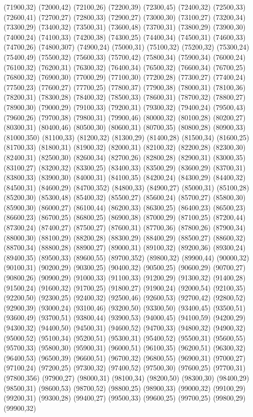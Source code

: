 (71900,32)
(72000,42)
(72100,26)
(72200,39)
(72300,45)
(72400,32)
(72500,33)
(72600,41)
(72700,27)
(72800,33)
(72900,27)
(73000,30)
(73100,27)
(73200,34)
(73300,29)
(73400,32)
(73500,31)
(73600,48)
(73700,31)
(73800,29)
(73900,30)
(74000,24)
(74100,33)
(74200,38)
(74300,25)
(74400,34)
(74500,31)
(74600,33)
(74700,26)
(74800,307)
(74900,24)
(75000,31)
(75100,32)
(75200,32)
(75300,24)
(75400,49)
(75500,32)
(75600,33)
(75700,42)
(75800,34)
(75900,34)
(76000,24)
(76100,32)
(76200,31)
(76300,32)
(76400,34)
(76500,32)
(76600,34)
(76700,25)
(76800,32)
(76900,30)
(77000,29)
(77100,30)
(77200,28)
(77300,27)
(77400,24)
(77500,23)
(77600,27)
(77700,25)
(77800,37)
(77900,38)
(78000,31)
(78100,36)
(78200,31)
(78300,28)
(78400,32)
(78500,33)
(78600,31)
(78700,32)
(78800,27)
(78900,30)
(79000,29)
(79100,33)
(79200,31)
(79300,32)
(79400,24)
(79500,43)
(79600,26)
(79700,38)
(79800,31)
(79900,46)
(80000,32)
(80100,28)
(80200,27)
(80300,31)
(80400,46)
(80500,30)
(80600,31)
(80700,35)
(80800,28)
(80900,33)
(81000,350)
(81100,33)
(81200,32)
(81300,29)
(81400,28)
(81500,34)
(81600,25)
(81700,33)
(81800,31)
(81900,32)
(82000,31)
(82100,32)
(82200,28)
(82300,30)
(82400,31)
(82500,30)
(82600,34)
(82700,26)
(82800,28)
(82900,31)
(83000,35)
(83100,27)
(83200,32)
(83300,25)
(83400,33)
(83500,29)
(83600,29)
(83700,31)
(83800,33)
(83900,30)
(84000,31)
(84100,35)
(84200,24)
(84300,29)
(84400,32)
(84500,31)
(84600,29)
(84700,352)
(84800,33)
(84900,27)
(85000,31)
(85100,28)
(85200,30)
(85300,48)
(85400,32)
(85500,27)
(85600,24)
(85700,27)
(85800,30)
(85900,30)
(86000,27)
(86100,44)
(86200,33)
(86300,25)
(86400,23)
(86500,23)
(86600,23)
(86700,25)
(86800,25)
(86900,38)
(87000,29)
(87100,25)
(87200,44)
(87300,24)
(87400,27)
(87500,27)
(87600,31)
(87700,36)
(87800,26)
(87900,34)
(88000,30)
(88100,29)
(88200,28)
(88300,29)
(88400,29)
(88500,27)
(88600,32)
(88700,34)
(88800,28)
(88900,27)
(89000,31)
(89100,32)
(89200,36)
(89300,24)
(89400,35)
(89500,33)
(89600,55)
(89700,352)
(89800,32)
(89900,44)
(90000,32)
(90100,31)
(90200,29)
(90300,25)
(90400,32)
(90500,25)
(90600,29)
(90700,27)
(90800,26)
(90900,29)
(91000,33)
(91100,33)
(91200,29)
(91300,32)
(91400,28)
(91500,24)
(91600,32)
(91700,25)
(91800,27)
(91900,24)
(92000,54)
(92100,35)
(92200,50)
(92300,25)
(92400,32)
(92500,46)
(92600,53)
(92700,42)
(92800,52)
(92900,39)
(93000,24)
(93100,46)
(93200,50)
(93300,50)
(93400,45)
(93500,51)
(93600,49)
(93700,51)
(93800,44)
(93900,53)
(94000,45)
(94100,59)
(94200,29)
(94300,32)
(94400,50)
(94500,31)
(94600,52)
(94700,33)
(94800,32)
(94900,32)
(95000,52)
(95100,34)
(95200,51)
(95300,31)
(95400,52)
(95500,31)
(95600,55)
(95700,33)
(95800,30)
(95900,31)
(96000,51)
(96100,35)
(96200,51)
(96300,32)
(96400,53)
(96500,39)
(96600,51)
(96700,32)
(96800,55)
(96900,31)
(97000,27)
(97100,24)
(97200,25)
(97300,32)
(97400,52)
(97500,30)
(97600,25)
(97700,31)
(97800,356)
(97900,27)
(98000,31)
(98100,34)
(98200,50)
(98300,30)
(98400,29)
(98500,31)
(98600,53)
(98700,52)
(98800,25)
(98900,33)
(99000,32)
(99100,29)
(99200,31)
(99300,28)
(99400,27)
(99500,33)
(99600,25)
(99700,25)
(99800,29)
(99900,32)
